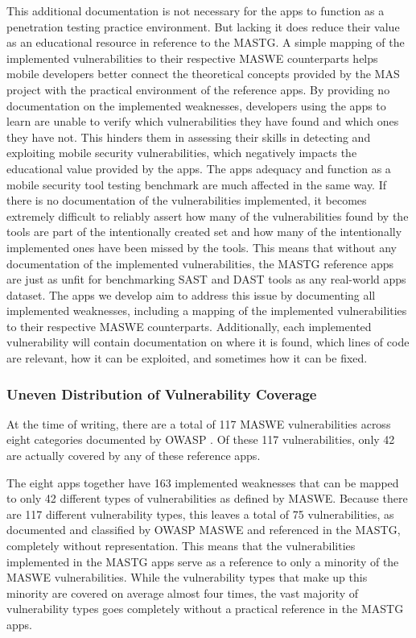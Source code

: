 This additional documentation is not necessary for the apps to function as a penetration testing practice environment. But lacking it does reduce their value as an educational resource in reference to the MASTG. A simple mapping of the implemented vulnerabilities to their respective MASWE counterparts helps mobile developers better connect the theoretical concepts provided by the MAS project with the practical environment of the reference apps. By providing no documentation on the implemented weaknesses, developers using the apps to learn are unable to verify which vulnerabilities they have found and which ones they have not. This hinders them in assessing their skills in detecting and exploiting mobile security vulnerabilities, which negatively impacts the educational value provided by the apps. The apps adequacy and function as a mobile security tool testing benchmark are much affected in the same way. If there is no documentation of the vulnerabilities implemented, it becomes extremely difficult to reliably assert how many of the vulnerabilities found by the tools are part of the intentionally created set and how many of the intentionally implemented ones have been missed by the tools. This means that without any documentation of the implemented vulnerabilities, the MASTG reference apps are just as unfit for benchmarking SAST and DAST tools as any real-world apps dataset. The apps we develop aim to address this issue by documenting all implemented weaknesses, including a mapping of the implemented vulnerabilities to their respective MASWE counterparts. Additionally, each implemented vulnerability will contain documentation on where it is found, which lines of code are relevant, how it can be exploited, and sometimes how it can be fixed.

\subsubsection{Uneven Distribution of Vulnerability Coverage}
At the time of writing, there are a total of 117 MASWE vulnerabilities across eight categories documented by OWASP \cite{owasp_maswe_website}. Of these 117 vulnerabilities, only 42 are actually covered by any of these reference apps. 

The eight apps together have 163 implemented weaknesses that can be mapped to only 42 different types of vulnerabilities as defined by MASWE. Because there are 117 different vulnerability types, this leaves a total of 75 vulnerabilities, as documented and classified by OWASP MASWE and referenced in the MASTG, completely without representation. This means that the vulnerabilities implemented in the MASTG apps serve as a reference to only a minority of the MASWE vulnerabilities. While the vulnerability types that make up this minority are covered on average almost four times, the vast majority of vulnerability types goes completely without a practical reference in the MASTG apps. 

